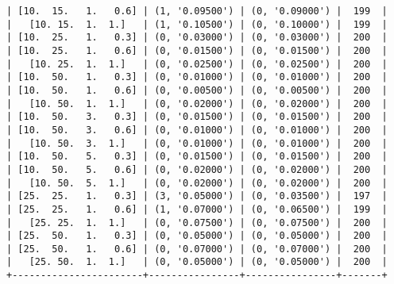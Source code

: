 \documentclass{article}
\begin{document}
\begin{verbatim}
| [10.  15.   1.   0.6] | (1, '0.09500') | (0, '0.09000') |  199  |
|   [10. 15.  1.  1.]   | (1, '0.10500') | (0, '0.10000') |  199  |
| [10.  25.   1.   0.3] | (0, '0.03000') | (0, '0.03000') |  200  |
| [10.  25.   1.   0.6] | (0, '0.01500') | (0, '0.01500') |  200  |
|   [10. 25.  1.  1.]   | (0, '0.02500') | (0, '0.02500') |  200  |
| [10.  50.   1.   0.3] | (0, '0.01000') | (0, '0.01000') |  200  |
| [10.  50.   1.   0.6] | (0, '0.00500') | (0, '0.00500') |  200  |
|   [10. 50.  1.  1.]   | (0, '0.02000') | (0, '0.02000') |  200  |
| [10.  50.   3.   0.3] | (0, '0.01500') | (0, '0.01500') |  200  |
| [10.  50.   3.   0.6] | (0, '0.01000') | (0, '0.01000') |  200  |
|   [10. 50.  3.  1.]   | (0, '0.01000') | (0, '0.01000') |  200  |
| [10.  50.   5.   0.3] | (0, '0.01500') | (0, '0.01500') |  200  |
| [10.  50.   5.   0.6] | (0, '0.02000') | (0, '0.02000') |  200  |
|   [10. 50.  5.  1.]   | (0, '0.02000') | (0, '0.02000') |  200  |
| [25.  25.   1.   0.3] | (3, '0.05000') | (0, '0.03500') |  197  |
| [25.  25.   1.   0.6] | (1, '0.07000') | (0, '0.06500') |  199  |
|   [25. 25.  1.  1.]   | (0, '0.07500') | (0, '0.07500') |  200  |
| [25.  50.   1.   0.3] | (0, '0.05000') | (0, '0.05000') |  200  |
| [25.  50.   1.   0.6] | (0, '0.07000') | (0, '0.07000') |  200  |
|   [25. 50.  1.  1.]   | (0, '0.05000') | (0, '0.05000') |  200  |
+-----------------------+----------------+----------------+-------+
\end{verbatim}
\end{document}
